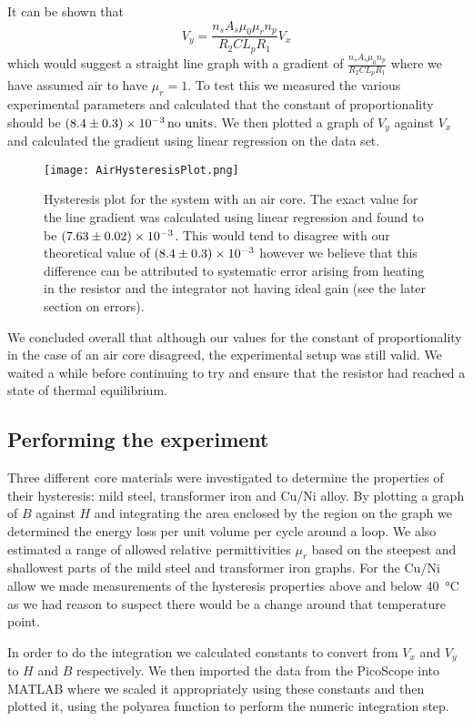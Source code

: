 \documentclass[12pt]{article}
\begin{document}
It can be shown that
\begin{equation}
V_y = \frac{n_s A_s \mu_0 \mu_r n_p}{R_2 C L_p R_1} V_x
\end{equation}
which would suggest a straight line graph with a gradient of $\frac{n_s A_s \mu_0 n_p}{R_2 C L_p R_1}$ where we have assumed air to have $\mu_r = 1$. To test this we measured the various experimental parameters and calculated that the constant of proportionality should be $\SI{8.4 \pm 0.3 e-3}{\text{no units}}$. We then plotted a graph of $V_y$ against $V_x$ and calculated the gradient using linear regression on the data set.
\begin{figure}[H]
\centering
\texttt{[image: AirHysteresisPlot.png]}
\caption{Hysteresis plot for the system with an air core. The exact value for the line gradient was calculated using linear regression and found to be $\SI{7.63 \pm 0.02 e-3}{}$. This would tend to disagree with our theoretical value of $\SI{8.4 \pm 0.3 e-3}{}$ however we believe that this difference can be attributed to systematic error arising from heating in the resistor and the integrator not having ideal gain (see the later section on errors).}
\label{AitHysteresisPlot}
\end{figure}

We concluded overall that although our values for the constant of proportionality in the case of an air core disagreed, the experimental setup was still valid. We waited a while before continuing to try and ensure that the resistor had reached a state of thermal equilibrium.

\subsection{Performing the experiment}

Three different core materials were investigated to determine the properties of their hysteresis: mild steel, transformer iron and Cu/Ni alloy. By plotting a graph of $B$ against $H$ and integrating the area enclosed by the region on the graph we determined the energy loss per unit volume per cycle around a loop. We also estimated a range of allowed relative permittivities $\mu_r$ based on the steepest and shallowest parts of the mild steel and transformer iron graphs. For the Cu/Ni allow we made measurements of the hysteresis properties above and below \SI{40}{\celsius} as we had reason to suspect there would be a change around that temperature point. \cite{labmanual}

In order to do the integration we calculated constants to convert from $V_x$ and $V_y$ to $H$ and $B$ respectively. We then imported the data from the PicoScope into MATLAB where we scaled it appropriately using these constants and then plotted it, using the polyarea function to perform the numeric integration step.
\end{document}
